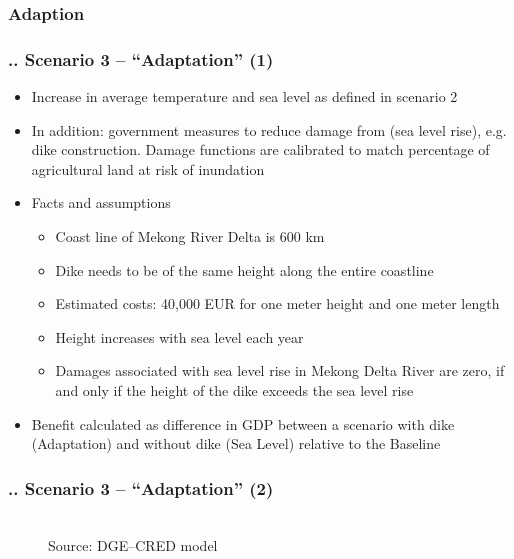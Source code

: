 \documentclass[11pt,aspectratio=169]{beamer}
\begin{document}
\subsubsection{Adaption}
\begin{frame}
\frametitle{{\thesection.\thesubsection.\thesubsubsection} Scenario 3 -- "`Adaptation"' (1)}
\begin{itemize}
\item Increase in average temperature and sea level as defined in scenario 2 
\item In addition: government measures to reduce damage from (sea level rise), e.g. dike construction. Damage functions are calibrated to match percentage of agricultural land at risk of inundation
\item Facts and assumptions
	\begin{itemize}
		\item Coast line of Mekong River Delta is 600 km
		\item Dike needs to be of the same height along the entire coastline
		\item Estimated costs: 40,000 EUR for one meter height and one meter length 
		\item Height increases with sea level each year
		\item Damages associated with sea level rise in Mekong Delta River are zero, if and only if the height of the dike exceeds the sea level rise
	\end{itemize}
\item Benefit calculated as difference in GDP between a scenario with dike (Adaptation) and without dike (Sea Level) relative to the Baseline 
\end{itemize}
\end{frame}

\begin{frame}
\frametitle{{\thesection.\thesubsection.\thesubsubsection} Scenario 3 -- "`Adaptation"' (2)}
\begin{figure}
			\centering
			\\
			\footnotesize{Source: DGE--CRED model}
		\end{figure}
\end{frame}
\end{document}
